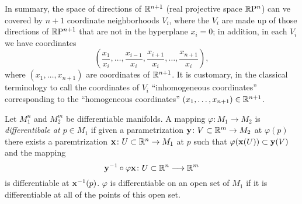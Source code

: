\begin{example}
  In summary, the space of directions of \(\mathbb{R}^{n+1}\) (real projective
  space \(\mathbb{R}\mathrm{P}^n\)) can ve covered by \(n+1\) coordinate neighborhoods
  \(V_i\), where the \(V_i\) are made up of those directions of
  \(\mathbb{R}\mathrm{P}^{n+1}\) that are not in the hyperplane \(x_i=0\); in addition,
  in each \(V_i\) we have coordinates
  \[
    \left(\frac{x_1}{x_i},\dotsc,\frac{x_{i-1}}{x_i},
    \frac{x_{i+1}}{x_i},\dotsc,\frac{x_{n+1}}{x_i}\right),
  \]
  where \((x_1,\dotsc,x_{n+1})\) are coordinates of \(\mathbb{R}^{n+1}\). It is
  customary, in the classical terminology to call the coordinates of
  \(V_i\) ``inhomogeneous coordinates'' corresponding to the ``homogeneous
  coordinates'' \((x_1,\dotsc,x_{n+1})\in\mathbb{R}^{n+1}\).
\end{example}

\begin{definition}
  Let \(M_1^n\) and \(M_2^m\) be differentiable manifolds. A mapping
  \(\varphi\colon M_1\to M_2\) is \emph{differentibale at \(p\in M_1\)} if
  given a parametrization \(\mathbf{y}\colon V\subset\mathbb{R}^m\to M_2\) at
  \(\varphi(p)\) there exists a paremtrization \(\mathbf{x}\colon
  U\subset\mathbb{R}^n\to M_1\) at \(p\) such that
  \(\varphi(\mathbf{x}(U))\subset\mathbf{y}(V)\) and the mapping
  \[
    \mathbf{y}^{-1}\circ\varphi\mathbf{x}\colon U\subset\mathbb{R}^n\longrightarrow\mathbb{R}^m
  \]
  is differentiable at \(\mathbf{x}^{-1}(p)\). \(\varphi\) is differentiable on
  an open set of \(M_1\) if it is differentiable at all of the points of
  this open set.
\end{definition}

